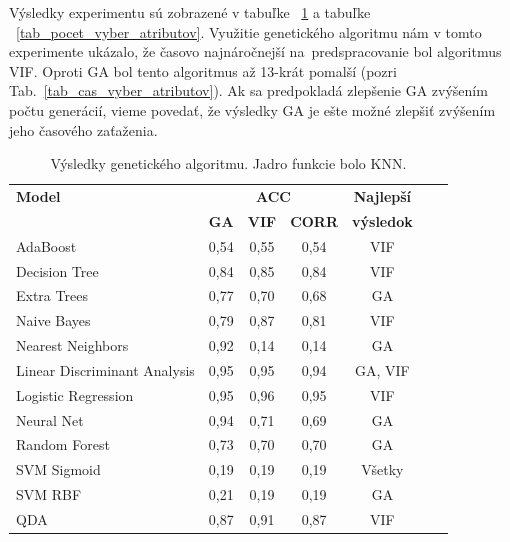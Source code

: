 \documentclass[runningheads]{llncs}
\begin{document}
Výsledky experimentu sú zobrazené v tabuľke ~\ref{tab_nastavenie_vyhodnotenie_experimentu} 
a tabuľke ~\ref{tab_pocet_vyber_atributov}. Využitie genetického algoritmu
nám v tomto experimente ukázalo, že časovo najnáročnejší na~predspracovanie bol algoritmus 
VIF. Oproti GA bol tento algoritmus až 13-krát pomalší (pozri Tab.~\ref{tab_cas_vyber_atributov}). Ak sa predpokladá zlepšenie GA zvýšením počtu generácií, vieme povedať, že výsledky GA je ešte možné zlepšiť 
zvýšením jeho časového zaťaženia. 


\begin{table}[]
    \centering
    \caption{Výsledky genetického algoritmu. Jadro funkcie bolo KNN.}\label{tab_nastavenie_vyhodnotenie_experimentu}
    \begin{tabular}{|l|c|c|c|c|c|c|}   
    \hline
    \textbf{Model}               & \multicolumn{3}{c|}{\textbf{ACC}}                       & \textbf{ Najlepší  } \\ 
                                 & \textbf{GA} & \textbf{VIF} & \textbf{CORR}& \textbf{výsledok}  \\ \hline
    AdaBoost                     & 0,54        & 0,55         & 0,54       & VIF   \\ \hline
    Decision Tree                & 0,84        & 0,85         & 0,84       & VIF     \\ \hline
    Extra Trees                  & 0,77        & 0,70         & 0,68       & GA       \\ \hline
    Naive Bayes                  & 0,79        & 0,87         & 0,81       & VIF        \\ \hline
    Nearest Neighbors            & 0,92        & 0,14         & 0,14       & GA            \\ \hline
    Linear Discriminant Analysis & 0,95        & 0,95         & 0,94       & GA, VIF              \\ \hline
    Logistic Regression          & 0,95        & 0,96         & 0,95       & VIF         \\ \hline
    Neural Net                   & 0,94        & 0,71         & 0,69       & GA           \\ \hline
    Random Forest                & 0,73        & 0,70         & 0,70       & GA              \\ \hline
    SVM Sigmoid                  & 0,19        & 0,19         & 0,19       & Všetky         \\ \hline
    SVM RBF                      & 0,21        & 0,19         & 0,19       & GA           \\ \hline
    QDA                          & 0,87        & 0,91         & 0,87       & VIF           \\ \hline
    \end{tabular}
\end{table}
\end{document}
